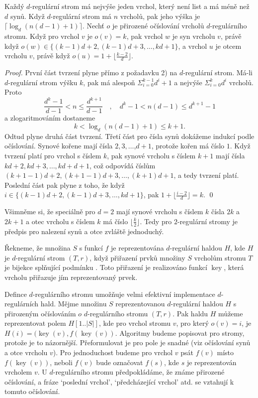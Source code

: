 \documentclass[a4paper,12pt]{article}
\DeclareMathOperator*{\key}{key}
\begin{document}
\begin{tvrzeni}Každý $d$-regulární strom má nejvýše jeden 
vrchol, který není list a má méně než $d$ synů. Když 
$d$-regulární strom má $n$ vrcholů, pak jeho 
výška je $\lceil\log_d(n(d-1)+1)\rceil$. Nechť $o$ je přirozené očíslování 
vrcholů $d$-regulárního stromu. Když pro vrchol 
$v$ je $o(v)=k$, pak vrchol $w$ je syn vrcholu $v$, právě 
když $o(w)\in \{(k-1)d+2,(k-1)d+3,\dots,kd+1\}$, a vrchol $u$ je 
otcem vrcholu $v$, právě když $o(u)=1+\lfloor\frac {k-2}d
\rfloor$. 
\end{tvrzeni}

\begin{proof}První část tvrzení plyne přímo z požadavku 2) na 
$d$-regulární strom. Má-li $d$-regulární strom výšku $
k$, 
pak má alespoň $\Sigma_{i=0}^{k-1}d^i+1$ a nejvýše $\Sigma_{
i=0}^kd^i$ 
vrcholů. Proto
$$\frac {d^k-1}{d-1}<n\le\frac {d^{k+1}}{d-1}\quad ,\quad d^k-1<n
(d-1)\le d^{k+1}-1$$
a zlogaritmováním dostaneme
$$k<\log_d(n(d-1)+1)\le k+1.$$
Odtud plyne 
druhá část tvrzení.  Třetí část pro čísla synů dokážeme 
indukcí podle očíslová\-ní.  Synové kořene mají čísla 
$2,3,\dots$,$d+1$,  protože kořen má číslo $1$.  Když tvrzení platí 
pro vrchol s číslem $k$, pak synové vrcholu s číslem $
k+1$ 
mají čísla $kd+2,kd+3,\dots,kd+d+1$, což odpovídá 
číslům $(k+1-1)d+2,(k+1-1)d+3,\dots,(k+1)d+1$, a tedy 
tvrzení platí. Poslední část pak plyne z toho, že když $
i\in \{(k-1)d+2,(k-1)d+3,\dots,kd+1\}$, pak 
$1+\lfloor\frac {i-2}d\rfloor =k$. \qed
\end{proof}

Všimněme si, že speciálně pro $d=2$ mají synové vrcholu s číslem $
k$ 
čísla $2k$ a $2k+1$ a otec vrcholu s číslem $k$ má číslo 
$\lfloor\frac k2\rfloor$. Tedy pro $2$-regulární stromy je předpis pro nalezení 
synů a otce zvláště jednoduchý.  

\v Rekneme, že množina $S$ s funkcí $f$ je reprezentována 
$d$-regulár\-ní haldou $H$, kde $H$ je $d$-regulární strom $
(T,r)$, když 
přiřazení prvků množiny $S$ vrcholům stromu 
$T$ je bijekce splňující podmínku . Toto přiřazení 
je realizováno funkcí $\key$, která vrcholu přiřazuje jím 
reprezentovaný prvek.

Defince $d$-regulárního stromu umožňuje velmi efektivní 
implementace $d$-regulárních hald.  Měj\-me množinu $
S$ 
reprezentovanou $d$-regulární haldou $H$ s přirozeným 
očís\-lo\-vá\-ním $o$ $d$-regulární\-ho stromu $
(T,r)$.  Pak haldu $H$ 
můžeme reprezentovat polem $H[1..|S|]$, kde pro vrchol 
stromu $v$, pro který $o(v)=i$, je $H(i)=(\key(v),f(\key(v))$.  Algoritmy 
budeme popisovat pro stromy, protože je to názornější.  
Přeformulovat je pro pole je snadné (viz 
očíslování synů a otce vrcholu $v$).  Pro jednoduchost 
budeme pro vrchol $v$ psát $f(v)$ místo $f(\key(v))$, neboli $
f(v)$ 
bude označovat $f(s)$, kde $s$ je reprezentován vrcholem $v$.  U 
$d$-regulárního stromu předpo\-klá\-dáme, že známe přirozené 
očíslování, a fráze `poslední vrchol', `před\-cházející vrchol' atd.  
se vztahují k tomuto očíslování.  
\end{document}
